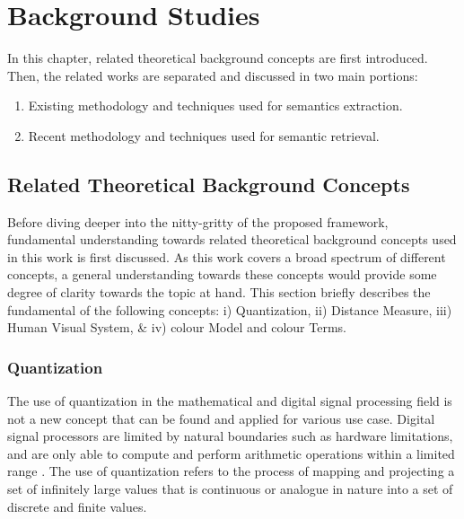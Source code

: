 


\chapter{Background Studies} \label{section:litreview}

In this chapter, related theoretical background concepts are first introduced.
Then, the related works are separated and discussed in two main portions:
\begin{enumerate}
 \item Existing methodology and techniques used for semantics extraction.
 \item Recent methodology and techniques used for semantic retrieval.
\end{enumerate}



\section{Related Theoretical Background Concepts}
\label{subsec:relatedConcepts}

Before diving deeper into the nitty-gritty of the proposed framework,
fundamental understanding towards related theoretical background concepts used
in this work is first discussed. As this work covers a broad spectrum of
different concepts, a general understanding towards these concepts would provide
some degree of clarity towards the topic at hand. This section briefly describes
the fundamental of the following concepts: i) Quantization, ii) Distance
Measure, iii) Human Visual System, \& iv) colour Model and colour Terms.


\subsection{Quantization}

The use of quantization in the mathematical and digital signal processing field
is not a new concept that can be found and applied for various use case. Digital
signal processors are limited by natural boundaries such as hardware
limitations, and are only able to compute and perform arithmetic operations
within a limited range \cite{spors_2018}. The use of quantization refers to the
process of mapping and projecting a set of infinitely large values that is
continuous or analogue in nature into a set of discrete and finite values.

